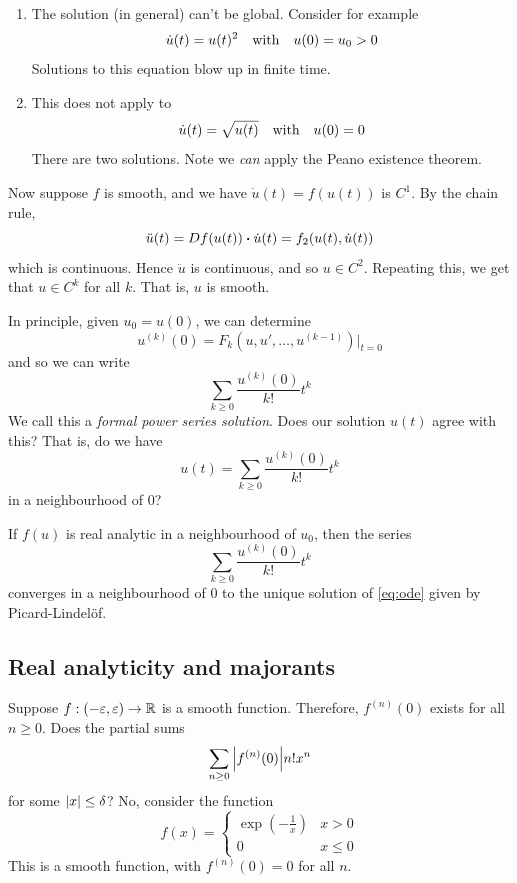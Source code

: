 \documentclass{article}
\begin{document}
\begin{remark}
    \begin{enumerate}
        \item The solution (in general) can't be global. Consider for example
        \[\dot u(t) = u(t)^2 \qqtext{with} u(0) = u_0 > 0\]
        Solutions to this equation blow up in finite time.
        \item This does not apply to
        \[\dot u(t) = \sqrt{u(t)} \qqtext{with} u(0) = 0\]
        There are two solutions. Note we \emph{can} apply the Peano existence theorem.
    \end{enumerate}
\end{remark}

Now suppose \(f\) is smooth, and we have \(\dot u(t) = f(u(t))\) is \(C^1\). By the chain rule,
\[\ddot u(t) = Df(u(t))\vdot \dot u(t) = f_2(u(t), \dot u(t))\]
which is continuous. Hence \(\ddot u\) is continuous, and so \(u \in C^2\). Repeating this, we get that \(u \in C^k\) for all \(k\). That is, \(u\) is smooth.

In principle, given \(u_0 = u(0)\), we can determine
\[u^{(k)}(0) = F_k\left(u, u', \dots, u^{(k-1)}\right)\big\vert_{t=0}\]
and so we can write
\[\sum_{k\ge 0}\frac{u^{(k)}(0)}{k!}t^k\]
We call this a \emph{formal power series solution}. Does our solution \(u(t)\) agree with this? That is, do we have
\[u(t) = \sum_{k \ge 0}\frac{u^{(k)}(0)}{k!}t^k\]
in a neighbourhood of \(0\)?

\begin{theorem}
    \label{thm:c-k-simple-ode}
    If \(f(u)\) is real analytic in a neighbourhood of \(u_0\), then the series
    \[\sum_{k \ge 0}\frac{u^{(k)}(0)}{k!}t^k\]
    converges in a neighbourhood of \(0\) to the unique solution of \cref{eq:ode} given by Picard-Lindel\"of.
\end{theorem}

\subsection{Real analyticity and majorants}

Suppose \(f : (-\varepsilon, \varepsilon) \to \mathbb{R}\) is a smooth function. Therefore, \(f^{(n)}(0)\) exists for all \(n \ge 0\). Does the partial sums
\[\sum_{n \ge 0}\abs{f^{(n)}(0)}{n!}x^n\]
for some \(\abs{x} \le \delta\)? No, consider the function
\[f(x) = \begin{cases}
    \exp(-\frac{1}{x}) & x > 0 \\
    0 & x \le 0
\end{cases}\]
This is a smooth function, with \(f^{(n)}(0) = 0\) for all \(n\).
\end{document}
